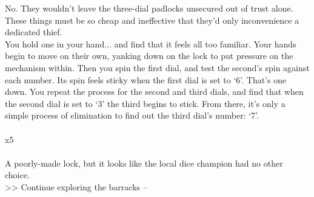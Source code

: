 No. They wouldn’t leave the three-dial padlocks unsecured out of trust alone. These things must be so cheap and ineffective that they’d only inconvenience a dedicated thief.\\

You hold one in your hand... and find that it feels all too familiar. Your hands begin to move on their own, yanking down on the lock to put pressure on the mechanism within. Then you spin the first dial, and test the second’s spin against each number. Its spin feels sticky when the first dial is set to ‘6’. That’s one down. You repeat the process for the second and third dials, and find that when the second dial is set to ‘3’ the third begins to stick. From there, it’s only a simple process of elimination to find out the third dial’s number: ‘7’.\\
\\
 x5\\
\\

A poorly-made lock, but it looks like the local dice champion had no other choice.\\

>> Continue exploring the barracks -- 